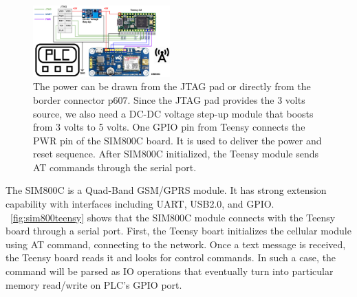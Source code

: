\begin{figure}[th]
	\includegraphics[width=0.47\textwidth]{figures/sim800teensy}
	\centering
	\caption{The power can be drawn from the JTAG pad or directly from the border connector p607. Since the JTAG pad provides the 3 volts source, we also need a DC-DC voltage step-up module that boosts from 3 volts to 5 volts. One GPIO pin from Teensy connects the PWR pin of the SIM800C board. It is used to deliver the power and reset sequence. After SIM800C initialized, the Teensy module sends AT commands through the serial port.}
	\label{fig:sim800teensy}
\end{figure}

The SIM800C is a Quad-Band GSM/GPRS module. It has strong extension capability with interfaces including UART, USB2.0, and GPIO. ~\autoref{fig:sim800teensy} shows that the SIM800C module connects with the Teensy board through a serial port. First, the Teensy boart initializes the cellular module using AT command, connecting to the network. Once a text message is received, the Teensy board reads it and looks for control commands. In such a case,  the command will be parsed as IO operations that eventually turn into particular memory read/write on PLC's GPIO port.
